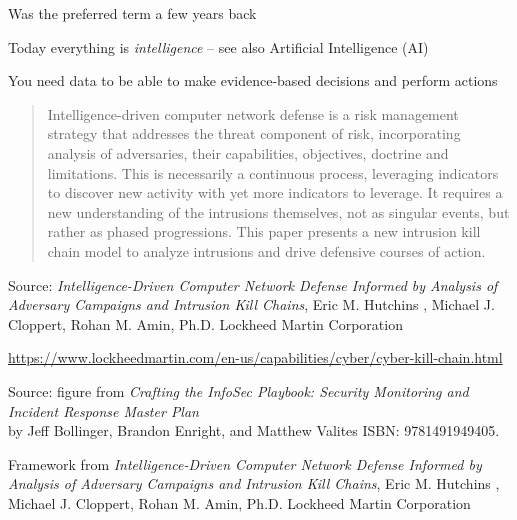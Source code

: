 \documentclass[Screen16to9,17pt]{foils}
\begin{document}
\begin{list2}
\item Was the preferred term a few years back
\item Today everything is \emph{intelligence} -- see also Artificial Intelligence (AI)
\item You need data to be able to make evidence-based decisions and perform actions
\end{list2}


\begin{quote}
Intelligence-driven computer network defense is a risk management strategy that addresses the threat
component of risk, incorporating analysis of adversaries, their capabilities, objectives, doctrine and limitations. This is necessarily a continuous process, leveraging indicators to discover new activity with yet more indicators to leverage. It requires a new understanding of the intrusions themselves, not as singular events, but rather as phased progressions. This paper presents a new intrusion kill chain model to analyze intrusions and drive defensive courses of action.

\end{quote}
Source: \emph{Intelligence-Driven Computer Network Defense Informed by Analysis of Adversary Campaigns and Intrusion Kill Chains}, Eric M. Hutchins , Michael J. Cloppert, Rohan M. Amin, Ph.D. Lockheed Martin Corporation\\{\footnotesize
 }

\url{https://www.lockheedmartin.com/en-us/capabilities/cyber/cyber-kill-chain.html}




\begin{list2}
\item  Source: figure from \emph{Crafting the InfoSec Playbook: Security Monitoring and Incident Response Master Plan}\\ by Jeff Bollinger, Brandon Enright, and Matthew Valites ISBN: 9781491949405.
\item Framework from \emph{Intelligence-Driven Computer Network Defense Informed by Analysis of Adversary Campaigns and Intrusion Kill Chains}, Eric M. Hutchins , Michael J. Cloppert, Rohan M. Amin, Ph.D. Lockheed Martin Corporation\\{\footnotesize
 }
\end{list2}
\end{document}
